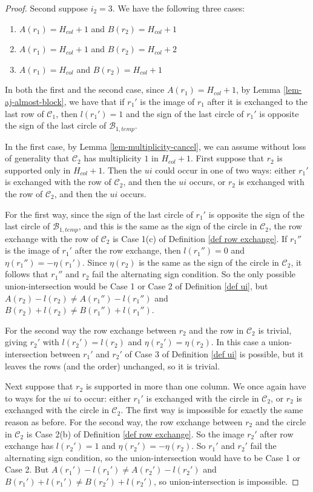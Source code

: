 \documentclass[11pt,letterpaper]{amsart}
\newcommand{\BB}{\mathcal{B}}
\newcommand{\CC}{\mathcal{C}}
\numberwithin{equation}{section}
\begin{document}
\begin{proof}
    Second suppose $i_2 = 3$. We have the following three cases:
    \begin{enumerate}
        \item $A(r_1) = H_{col}+1$ and $B(r_2) = H_{col}+1$
        \item $A(r_1) = H_{col}+1$ and $B(r_2) = H_{col}+2$
        \item $A(r_1) = H_{col}$ and $B(r_2) = H_{col}+1$
    \end{enumerate}

    In both the first and the second case, since $A(r_1) = H_{col}+1$, by Lemma \ref{lem-aj-almost-block}, we have that if $r_1'$ is the image of $r_1$ after it is exchanged to the last row of $\CC_1$, then $l(r_1') = 1$ and the sign of the last circle of $r_1'$ is opposite the sign of the last circle of $\BB_{1, temp}$.

    In the first case, by Lemma \ref{lem-multiplicity-cancel}, we can assume without loss of generality that $\CC_2$ has multiplicity $1$ in $H_{col}+1$. First suppose that $r_2$ is supported only in $H_{col}+1$. Then the $ui$ could occur in one of two ways: either $r_1'$ is exchanged with the row of $\CC_2$, and then the $ui$ occurs, or $r_2$ is exchanged with the row of $\CC_2$, and then the $ui$ occurs. 
    
    For the first way, since the sign of the last circle of $r_1'$ is opposite the sign of the last circle of $\BB_{1, temp}$, and this is the same as the sign of the circle in $\CC_2$, the row exchange with the row of $\CC_2$ is Case 1(c) of Definition \ref{def row exchange}. If $r_1''$ is the image of $r_1'$ after the row exchange, then $l(r_1'') = 0$ and $\eta(r_1'') = -\eta(r_1')$. Since $\eta(r_2)$ is the same as the sign of the circle in $\CC_2$, it follows that $r_1''$ and $r_2$ fail the alternating sign condition. So the only possible union-intersection would be Case 1 or Case 2 of Definition \ref{def ui}, but $A(r_2) - l(r_2) \neq A(r_1'') - l(r_1'')$ and $B(r_2) + l(r_2) \neq B(r_1'') + l(r_1'')$.

    For the second way the row exchange between $r_2$ and the row in $\CC_2$ is trivial, giving $r_2'$ with $l(r_2') = l(r_2)$ and $\eta(r_2') = \eta(r_2)$. In this case a union-intersection between $r_1'$ and $r_2'$ of Case 3 of Definition \ref{def ui} is possible, but it leaves the rows (and the order) unchanged, so it is trivial.

    Next suppose that $r_2$ is supported in more than one column. We once again have to ways for the $ui$ to occur: either $r_1'$ is exchanged with the circle in $\CC_2$, or $r_2$ is exchanged with the circle in $\CC_2$. The first way is impossible for exactly the same reason as before. For the second way, the row exchange between $r_2$ and the circle in $\CC_2$ is Case 2(b) of Definition \ref{def row exchange}. So the image $r_2'$ after row exchange has $l(r_2') = 1$ and $\eta(r_2') = -\eta(r_2)$. So $r_1'$ and $r_2'$ fail the alternating sign condition, so the union-intersection would have to be Case 1 or Case 2. But $A(r_1') - l(r_1') \neq A(r_2') - l(r_2')$ and $B(r_1') + l(r_1') \neq B(r_2') + l(r_2')$, so union-intersection is impossible.


\end{proof}
\end{document}
